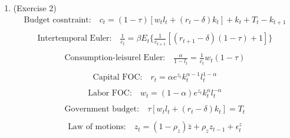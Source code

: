 \documentclass[letterpaper,12pt]{article}
\theoremstyle{definition}
\begin{document}
\begin{enumerate}
	
	\item(Exercise 2)\\
	\begin{equation} \label{eq1}
	\begin{split}
	\text{Budget cosntraint:} \quad c_{t} = (1 - \tau)[w_{t}l_{t} + (r_{t} - \delta)k_{t}] + k_{t} + T_{t} - k_{t + 1}\\
	\end{split}
	\end{equation}
	\begin{equation} \label{eq2}
	\begin{split}
	\text{Intertemporal Euler:} \quad \frac{1}{c_{t}} = \beta E_{t}\{  \frac{1}{c_{t + 1}}[(r_{t + 1} - \delta)(1 - \tau) + 1]\} \\
	\end{split}
	\end{equation}
	\begin{equation} \label{eq3}
	\begin{split}
	\text{Consumption-leisurel Euler:} \quad \frac{\alpha}{1 - l_{t}} = \frac{1}{c_{t}}w_{t} (1 - \tau) \\
	\end{split}
	\end{equation}
	\begin{equation} \label{eq4}
	\begin{split}
	\text{Capital FOC:} \quad r_{t} = \alpha e^{z_{t}}k_{t}^{\alpha - 1}l_{t}^{1 - \alpha} \\
	\end{split}
	\end{equation}
	\begin{equation} \label{eq5}
	\begin{split}
	\text{Labor FOC:} \quad w_{t} = (1 - \alpha) e^{z_{t}}k_{t}^{\alpha}l_{t}^{ - \alpha} \\
	\end{split}
	\end{equation}
	\begin{equation} \label{eq6}
	\begin{split}
	\text{Government budget:} \quad \tau[w_{t}l_{t} + (r_{t} - \delta)k_{t}] = T_{t}  \\
	\end{split}
	\end{equation}
	\begin{equation} \label{eq7}
	\begin{split}
	\text{Law of motions:} \quad z_{t} = (1 - \rho_{z})\bar{z} + \rho_{z}z_{t - 1} + \epsilon_{t}^{z} \\
	\end{split}
	\end{equation}


\end{enumerate}
\end{document}
